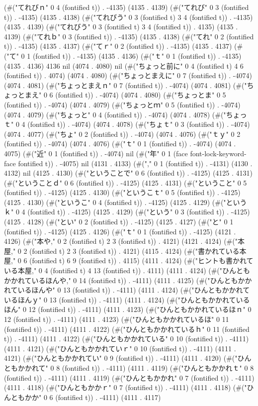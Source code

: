 (#("てれびｎ" 0 4 (fontified t)) . -4135) (4135 . 4139) (#("てれび" 0 3 (fontified t)) . -4135) (4135 . 4138) (#("てれびう" 0 3 (fontified t) 3 4 (fontified t)) . -4135) (4135 . 4139) (#("てれびう" 0 3 (fontified t) 3 4 (fontified t)) . 4135) (4135 . 4139) (#("てれｂ" 0 3 (fontified t)) . -4135) (4135 . 4138) (#("てれ" 0 2 (fontified t)) . -4135) (4135 . 4137) (#("てｒ" 0 2 (fontified t)) . -4135) (4135 . 4137) (#("て" 0 1 (fontified t)) . -4135) (4135 . 4136) (#("ｔ" 0 1 (fontified t)) . -4135) (4135 . 4136) 4136 nil (4074 . 4080) nil (#("ちょっと前に" 0 4 (fontified t) 4 6 (fontified t)) . 4074) (4074 . 4080) (#("ちょっとまえに" 0 7 (fontified t)) . -4074) (4074 . 4081) (#("ちょっとまえｎ" 0 7 (fontified t)) . -4074) (4074 . 4081) (#("ちょっとまえ" 0 6 (fontified t)) . -4074) (4074 . 4080) (#("ちょっとま" 0 5 (fontified t)) . -4074) (4074 . 4079) (#("ちょっとｍ" 0 5 (fontified t)) . -4074) (4074 . 4079) (#("ちょっと" 0 4 (fontified t)) . -4074) (4074 . 4078) (#("ちょっｔ" 0 4 (fontified t)) . -4074) (4074 . 4078) (#("ちょｔ" 0 3 (fontified t)) . -4074) (4074 . 4077) (#("ちょ" 0 2 (fontified t)) . -4074) (4074 . 4076) (#("ｔｙ" 0 2 (fontified t)) . -4074) (4074 . 4076) (#("ｔ" 0 1 (fontified t)) . -4074) (4074 . 4075) (#("近" 0 1 (fontified t)) . -4074) nil (#("年" 0 1 (face font-lock-keyword-face fontified t)) . -4075) nil (4131 . 4133) (#("," 0 1 (fontified t)) . -4131) (4130 . 4132) nil (4125 . 4130) (#("ということで" 0 6 (fontified t)) . -4125) (4125 . 4131) (#("ということｄ" 0 6 (fontified t)) . -4125) (4125 . 4131) (#("ということ" 0 5 (fontified t)) . -4125) (4125 . 4130) (#("というこｔ" 0 5 (fontified t)) . -4125) (4125 . 4130) (#("というこ" 0 4 (fontified t)) . -4125) (4125 . 4129) (#("というｋ" 0 4 (fontified t)) . -4125) (4125 . 4129) (#("という" 0 3 (fontified t)) . -4125) (4125 . 4128) (#("とい" 0 2 (fontified t)) . -4125) (4125 . 4127) (#("と" 0 1 (fontified t)) . -4125) (4125 . 4126) (#("ｔ" 0 1 (fontified t)) . -4125) (4121 . 4126) (#("本や," 0 2 (fontified t) 2 3 (fontified t)) . 4121) (4121 . 4124) (#("本屋," 0 2 (fontified t) 2 3 (fontified t)) . 4121) (4115 . 4124) (#("書かれている本屋," 0 6 (fontified t) 6 9 (fontified t)) . 4115) (4111 . 4124) (#("ヒントも書かれている本屋," 0 4 (fontified t) 4 13 (fontified t)) . 4111) (4111 . 4124) (#("ひんともかかれているほんや," 0 14 (fontified t)) . -4111) (4111 . 4125) (#("ひんともかかれているほんや" 0 13 (fontified t)) . -4111) (4111 . 4124) (#("ひんともかかれているほんｙ" 0 13 (fontified t)) . -4111) (4111 . 4124) (#("ひんともかかれているほん" 0 12 (fontified t)) . -4111) (4111 . 4123) (#("ひんともかかれているほｎ" 0 12 (fontified t)) . -4111) (4111 . 4123) (#("ひんともかかれているほ" 0 11 (fontified t)) . -4111) (4111 . 4122) (#("ひんともかかれているｈ" 0 11 (fontified t)) . -4111) (4111 . 4122) (#("ひんともかかれている" 0 10 (fontified t)) . -4111) (4111 . 4121) (#("ひんともかかれていｒ" 0 10 (fontified t)) . -4111) (4111 . 4121) (#("ひんともかかれてい" 0 9 (fontified t)) . -4111) (4111 . 4120) (#("ひんともかかれて" 0 8 (fontified t)) . -4111) (4111 . 4119) (#("ひんともかかれｔ" 0 8 (fontified t)) . -4111) (4111 . 4119) (#("ひんともかかれ" 0 7 (fontified t)) . -4111) (4111 . 4118) (#("ひんともかかｒ" 0 7 (fontified t)) . -4111) (4111 . 4118) (#("ひんともかか" 0 6 (fontified t)) . -4111) (4111 . 4117) 